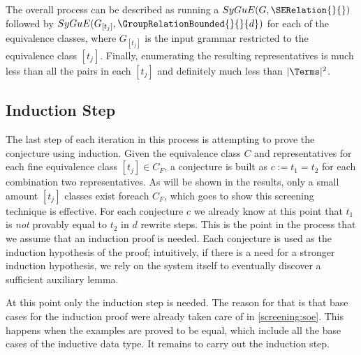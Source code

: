 The overall process can be described as running a $SyGuE(G, \SERelation{}{})$
followed by $SyGuE(G_{[t_j]}, \GroupRelationBounded{}{}{d})$
for each of the equivalence classes, where $G_{[t_j]}$ is the input grammar restricted to the equivalence class $[t_j]$.
Finally, enumerating the resulting representatives is much less than all the pairs in each $[t_j]$
and definitely much less than $|\Terms|^2$.

\subsection{Induction Step}

The last step of each iteration in this process is attempting to prove the conjecture using induction.
Given the equivalence class $C$ and representatives for each fine equivalence class $\left[ t_j \right] \in C_F$, a conjecture is built as $c := t_1 = t_2$ for each combination two representatives.
As will be shown in the results, only a small amount $\left[ t_j \right]$ classes exist foreach $C_F$, which goes to show this screening technique is effective. 
For each conjecture $c$ we already know at this point that $t_1$ is \emph{not} provably equal to $t_2$ in $d$ rewrite steps.
This is the point in the process that we assume that an induction proof is needed. Each conjecture is used as the induction hypothesis of the proof;
intuitively, if there is a need for a stronger induction hypothesis,
we rely on the system itself to eventually discover a sufficient auxiliary lemma.
\begin{comment}
at the past or at the future the system will prove it as a lemma and that knowledge will become available for the induction step.
Still, some lemmas only will obviously be impossible to find with this limitation, for example using a precondition $x > y$, $max(x,y) \quad \overrightarrow{x > y} \quad x$. Currently such a condition will need to arise from how functions are defined by in the given input. 
\end{comment}

At this point only the induction step is needed.
The reason for that is that base cases for the induction proof were already taken care of in \autoref{screening:soe}. 
This happens when the examples are proved to be equal, which include all the base cases of the inductive data type. It remains to carry out the induction step.

